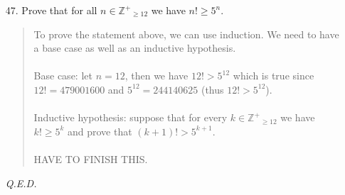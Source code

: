 \documentclass[12pt, a4paper]{article}                      %
\newcommand{\intzp}{\mathbb{Z^+}}
\begin{document}
\begin{itemize}
\item[47.]
Prove that for all $n \in \intzp_{\geq 12}$ we have $n! \geq 5^n$.
\begin{quote}
To prove the statement above, we can use induction. We need to have a base case as well as an inductive hypothesis.\\\\
Base case: let $n = 12$, then we have $12! > 5^{12}$ which is true since $12! = 479001600$ and $5^{12} = 244140625$ (thus $12! > 5^{12}$).\\\\
Inductive hypothesis: suppose that for every $k \in \intzp_{\geq 12}$ we have $k! \geq 5^k$ and prove that $(k + 1)! > 5^{k + 1}$.\\\\
HAVE TO FINISH THIS.
\end{quote}

\begin{flushright}
\textit{Q.E.D.}
\end{flushright}
\end{itemize}
\end{document}
